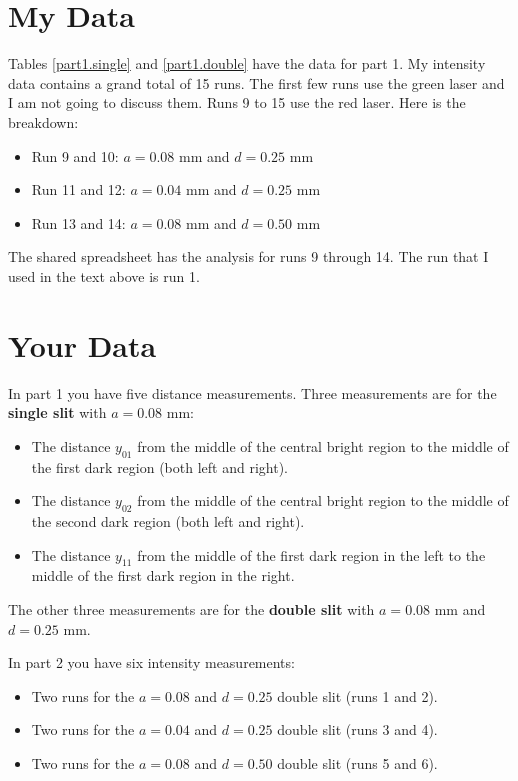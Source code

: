 \section{My Data}
Tables \ref{part1.single} and \ref{part1.double} have the data for part 1. My intensity data contains a grand total of 15 runs. The first few runs use the green laser and I am not going to discuss them. Runs 9 to 15 use the red laser. Here is the breakdown:
\begin{itemize}
	\item Run 9 and 10: $a = 0.08$ mm and $d = 0.25$ mm
	\item Run 11 and 12: $a = 0.04$ mm and $d = 0.25$ mm
	\item Run 13 and 14: $a = 0.08$ mm and $d = 0.50$ mm
\end{itemize}
The shared spreadsheet has the analysis for runs 9 through 14. The run that I used in the text above is run 1.
\section{Your Data}
In part 1 you have five distance measurements. Three measurements are for the \textbf{single slit} with $a = 0.08$ mm:
\begin{itemize}
	\item The distance $y_{01}$ from the middle of the central bright region to the middle of the first dark region (both left and right).
	\item The distance $y_{02}$ from the middle of the central bright region to the middle of the second dark region (both left and right).
	\item The distance $y_{11}$ from the middle of the first dark region in the left to the middle of the first dark region in the right.
\end{itemize}
The other three measurements are for the \textbf{double slit} with $a = 0.08$ mm and $d = 0.25$ mm.

In part 2 you have six intensity measurements:
\begin{itemize}
	\item Two runs for the $a = 0.08$ and $d = 0.25$ double slit (runs 1 and 2).
	\item Two runs for the $a = 0.04$ and $d = 0.25$ double slit (runs 3 and 4).
	\item Two runs for the $a = 0.08$ and $d = 0.50$ double slit (runs 5 and 6).
\end{itemize}
